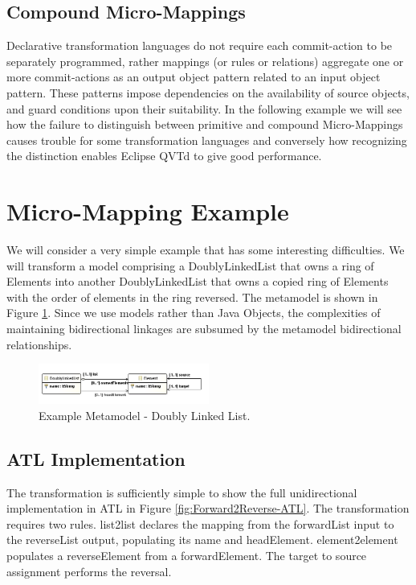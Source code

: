 \documentclass[conference]{IEEEtran}
\begin{document}
\subsection{Compound Micro-Mappings}

Declarative transformation languages do not require each commit-action to be separately programmed, rather mappings (or rules or relations) aggregate one or more commit-actions as an output object pattern related to an input object pattern. These patterns impose dependencies on the availability of source objects, and guard conditions upon their suitability. In the following example we will see how the failure to distinguish between primitive and compound Micro-Mappings causes trouble for some transformation languages and conversely how recognizing the distinction enables Eclipse QVTd to give good performance.

\section{Micro-Mapping Example}\label{Micro-Mapping Example}

We will consider a very simple example that has some interesting difficulties. We will transform a model comprising a DoublyLinkedList that owns a ring of Elements into another DoublyLinkedList that owns a copied ring of Elements with the order of elements in the ring reversed. The metamodel is shown in Figure \ref{fig:DoublyLinkedListMM}. Since we use models rather than Java Objects, the complexities of maintaining bidirectional linkages are subsumed by the metamodel bidirectional relationships.

\begin{figure}[h]
	\centering
	\includegraphics[width=0.5\textwidth]{doublylinkedlist.png}
	\caption{Example Metamodel - Doubly Linked List.}
	\label{fig:DoublyLinkedListMM}
\end{figure}

\subsection{ATL Implementation}

The transformation is sufficiently simple to show the full unidirectional implementation in ATL in Figure \ref{fig:Forward2Reverse-ATL}. The transformation requires two rules. list2list declares the mapping from the forwardList input to the reverseList output, populating its name and headElement. element2element populates a reverseElement from a forwardElement. The target to source assignment performs the reversal.
\end{document}
